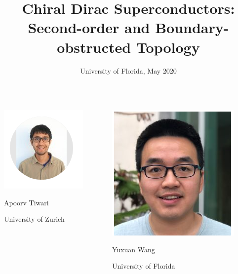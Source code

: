 \documentclass{beamer}
\title{Chiral Dirac Superconductors: Second-order and Boundary-obstructed Topology}
\date{University of Florida, May 2020}
\renewcommand{\(}{\left(}
\renewcommand{\)}{\right)}
\renewcommand{\[}{\left[}
\renewcommand{\]}{\right]}
\begin{document}
\frame{\titlepage 
    } 

\begin{frame}
    \centering
    \begin{columns}
        \begin{column}{0.5\textwidth}
            \centering
            \includegraphics[trim= 0 20 0 20,clip]{Screenshot_20200516_213116.png}

            Apoorv Tiwari
            
            University of Zurich
        \end{column}
        \begin{column}{0.5\textwidth}
            \centering
            \includegraphics[scale=0.4]{YWSC.png}

            Yuxuan Wang 

            University of Florida
        \end{column}
    \end{columns}
\end{frame}
\end{document}
